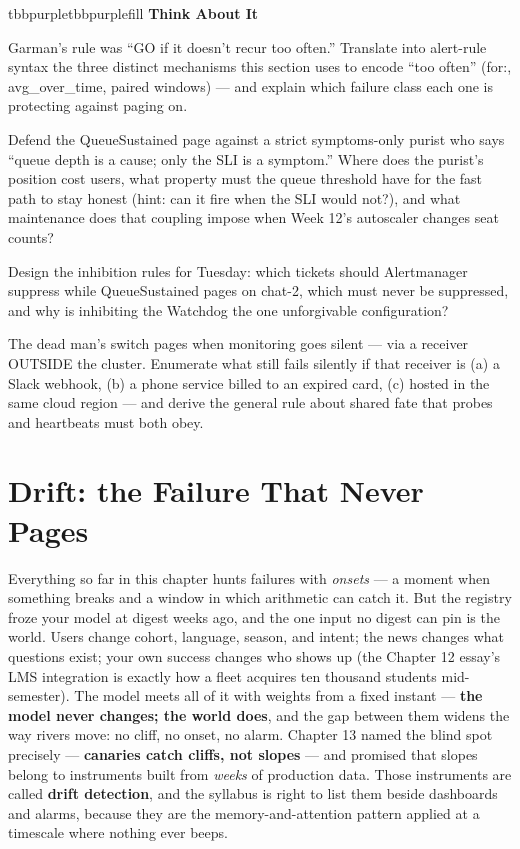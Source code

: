 \begin{calloutbox}{tbbpurple}{tbbpurplefill}
{\normalsize\bfseries\color{tbbpurple}Think About It}\par\vspace{3pt}
\begin{tbbitemize}
  \item Garman’s rule was “GO if it doesn’t recur too often.” Translate into alert-rule syntax the three distinct mechanisms this section uses to encode “too often” (for:, avg\_over\_time, paired windows) — and explain which failure class each one is protecting against paging on.
  \item Defend the QueueSustained page against a strict symptoms-only purist who says “queue depth is a cause; only the SLI is a symptom.” Where does the purist’s position cost users, what property must the queue threshold have for the fast path to stay honest (hint: can it fire when the SLI would not?), and what maintenance does that coupling impose when Week 12’s autoscaler changes seat counts?
  \item Design the inhibition rules for Tuesday: which tickets should Alertmanager suppress while QueueSustained pages on chat-2, which must never be suppressed, and why is inhibiting the Watchdog the one unforgivable configuration?
  \item The dead man’s switch pages when monitoring goes silent — via a receiver OUTSIDE the cluster. Enumerate what still fails silently if that receiver is (a) a Slack webhook, (b) a phone service billed to an expired card, (c) hosted in the same cloud region — and derive the general rule about shared fate that probes and heartbeats must both obey.
\end{tbbitemize}
\end{calloutbox}

\section{Drift: the Failure That Never Pages}

Everything so far in this chapter hunts failures with \textit{onsets} — a moment when something breaks and a window in which arithmetic can catch it. But the registry froze your model at digest  weeks ago, and the one input no digest can pin is the world. Users change cohort, language, season, and intent; the news changes what questions exist; your own success changes who shows up (the Chapter 12 essay’s LMS integration is exactly how a fleet acquires ten thousand students mid-semester). The model meets all of it with weights from a fixed instant — \textbf{the model never changes; the world does}, and the gap between them widens the way rivers move: no cliff, no onset, no alarm. Chapter 13 named the blind spot precisely — \textbf{canaries catch cliffs, not slopes} — and promised that slopes belong to instruments built from \textit{weeks} of production data. Those instruments are called \textbf{drift detection}, and the syllabus is right to list them beside dashboards and alarms, because they are the memory-and-attention pattern applied at a timescale where nothing ever beeps.

